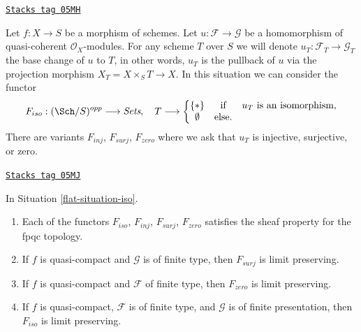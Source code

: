 \begin{definition}
\label{flat-situation-iso}
\href{https://stacks.math.columbia.edu/tag/05MH}{\texttt{Stacks tag 05MH}}

Let $f : X \to S$ be a morphism of schemes.
Let $u : \mathcal{F} \to \mathcal{G}$ be a homomorphism of
quasi-coherent $\mathcal{O}_X$-modules. For any scheme $T$ over
$S$ we will denote $u_T : \mathcal{F}_T \to \mathcal{G}_T$ the
base change of $u$ to $T$, in other words, $u_T$ is the pullback
of $u$ via the projection morphism $X_T = X \times_S T \to X$.
In this situation we can consider the functor
\begin{equation}
\label{equation-iso}
F_{iso} : (\Sch/S)^{opp} \longrightarrow \textit{Sets}, \quad
T \longrightarrow \left\{
\begin{matrix}
\{*\} & \text{if} & u_T \text{ is an isomorphism}, \\
\emptyset & \text{else.} &
\end{matrix}
\right.
\end{equation}
There are variants $F_{inj}$, $F_{surj}$, $F_{zero}$ where we ask that
$u_T$ is injective, surjective, or zero.
\end{definition}

\begin{lemma}
\label{flat-lemma-iso-sheaf}
\href{https://stacks.math.columbia.edu/tag/05MJ}{\texttt{Stacks tag 05MJ}}

In Situation \ref{flat-situation-iso}.
\begin{enumerate}
\item Each of the functors $F_{iso}$, $F_{inj}$, $F_{surj}$, $F_{zero}$
satisfies the sheaf property for the fpqc topology.
\item If $f$ is quasi-compact and $\mathcal{G}$ is of finite type,
then $F_{surj}$ is limit preserving.
\item If $f$ is quasi-compact and $\mathcal{F}$ of finite type, then
$F_{zero}$ is limit preserving.
\item If $f$ is quasi-compact, $\mathcal{F}$ is of finite type, and
$\mathcal{G}$ is of finite presentation, then $F_{iso}$ is limit preserving.
\end{enumerate}
\end{lemma}

